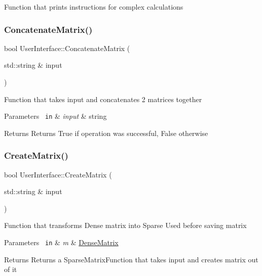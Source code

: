 Function that prints instructions for complex calculations \mbox{\label{class_user_interface_af7f6c880f4be7faef6a97cd568703f40}} 
\subsubsection{\texorpdfstring{ConcatenateMatrix()}{ConcatenateMatrix()}}
{\footnotesize\ttfamily bool User\+Interface\+::\+Concatenate\+Matrix (\begin{DoxyParamCaption}\item[{std\+::string \&}]{input }\end{DoxyParamCaption})}

Function that takes input and concatenates 2 matrices together 
\begin{DoxyParams}[1]{Parameters}
\mbox{\texttt{ in}}  & {\em input} & string \\
\hline
\end{DoxyParams}
\begin{DoxyReturn}{Returns}
Returns True if operation was successful, False otherwise 
\end{DoxyReturn}
\mbox{\label{class_user_interface_a3c681f0d9a46f4dde3df29066e68c3a9}} 
\subsubsection{\texorpdfstring{CreateMatrix()}{CreateMatrix()}}
{\footnotesize\ttfamily bool User\+Interface\+::\+Create\+Matrix (\begin{DoxyParamCaption}\item[{std\+::string \&}]{input }\end{DoxyParamCaption})}

Function that transforms Dense matrix into Sparse Used before saving matrix 
\begin{DoxyParams}[1]{Parameters}
\mbox{\texttt{ in}}  & {\em m} & \mbox{\hyperlink{class_dense_matrix}{Dense\+Matrix}} \\
\hline
\end{DoxyParams}
\begin{DoxyReturn}{Returns}
Returns a Sparse\+Matrix\+Function that takes input and creates matrix out of it 
\end{DoxyReturn}


